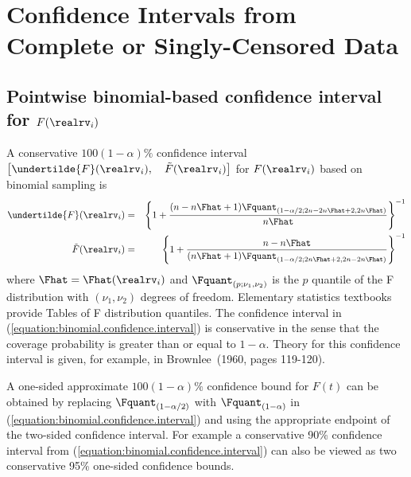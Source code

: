 \section{Confidence Intervals from Complete or Singly-Censored Data}
\label{section:ci.simple.cen}
\subsection{Pointwise 
binomial-based confidence interval for $F(\realrv_{i})$}
\label{section:binomial.confidence.intervals}

A conservative $100(1-\alpha)\%$ confidence interval $\left [
\undertilde{F}(\realrv_{i}), \quad
\tilde{F}(\realrv_{i})
\right ]$ for $F(\realrv_{i})$
based on binomial sampling is
\begin{eqnarray}
\label{equation:binomial.confidence.interval}
\undertilde{F}(\realrv_{i}) &=&
\left \{
1+
\frac{(n-n\Fhat+1) \Fquant_{(1-\alpha/2; 2n-2n\Fhat+2,
2 n \Fhat)}
     }
     {
n \Fhat
     }
\right \}^{-1}
\\ \nonumber
\tilde{F}(\realrv_{i})&=&
\left \{
1+
\frac
{
n-n\Fhat
}
{
(n\Fhat+1) \Fquant_{(1-\alpha/2; 2n\Fhat+2,
         2n-2n\Fhat)}
}
\right \}^{-1}
\end{eqnarray}
where $\Fhat=\Fhat(\realrv_{i})$ and $\Fquant_{(p; \nu_{1},
\nu_{2})}$ is the $p$ quantile of the F distribution
with $(\nu_{1}, \nu_{2})$ degrees of freedom.
Elementary statistics textbooks provide
Tables of F distribution quantiles. The confidence
interval in (\ref{equation:binomial.confidence.interval}) is
conservative in the sense that the coverage probability is greater
than or equal to $1-\alpha$.  Theory for this confidence interval is
given, for example, in Brownlee~(1960, pages 119-120).  

A one-sided approximate $100(1-\alpha)\%$ confidence bound for $F(t)$
can be obtained by replacing $\Fquant_{(1-\alpha/2)}$ with
$\Fquant_{(1-\alpha)}$ in
(\ref{equation:binomial.confidence.interval}) and using the
appropriate endpoint of the two-sided confidence interval.  For
example a conservative 90\% confidence interval from
(\ref{equation:binomial.confidence.interval}) can also be viewed as
two conservative 95\% one-sided confidence bounds.

